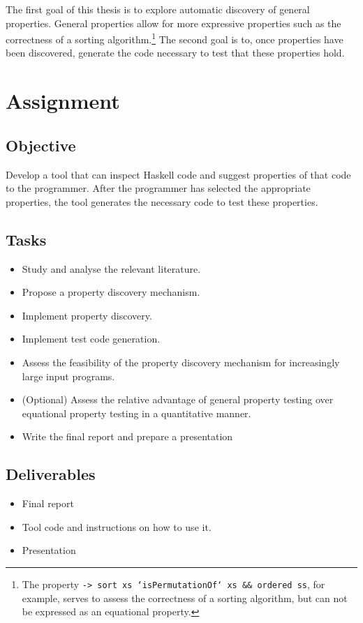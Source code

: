 \documentclass[a4paper, 11pt]{article}
\begin{document}
The first goal of this thesis is to explore automatic discovery of general properties.
General properties allow for more expressive properties such as the correctness of a sorting algorithm.\footnote{The property \texttt{\xs -> sort xs `isPermutationOf` xs && ordered ss}, for example, serves to assess the correctness of a sorting algorithm, but can not be expressed as an equational property.}
The second goal is to, once properties have been discovered, generate the code necessary to test that these properties hold.

\newpage

\section{Assignment}
\subsection{Objective}
Develop a tool that can inspect Haskell code and suggest properties of that code to the programmer.
After the programmer has selected the appropriate properties, the tool generates the necessary code to test these properties.

\subsection{Tasks}

\begin{itemize}
    \item Study and analyse the relevant literature.
    \item Propose a property discovery mechanism.
    \item Implement property discovery.
    \item Implement test code generation.
    \item Assess the feasibility of the property discovery mechanism for increasingly large input programs.
    \item (Optional) Assess the relative advantage of general property testing over equational property testing in a quantitative manner.
    \item Write the final report and prepare a presentation
\end{itemize}


\subsection{Deliverables}

\begin{itemize}
    \item Final report
    \item Tool code and instructions on how to use it.
    \item Presentation
\end{itemize}



\end{document}
